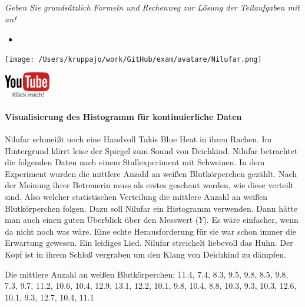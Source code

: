 \documentclass[a4paper, 9pt]{scrartcl}\usepackage[]{graphicx}\usepackage[]{xcolor}
\begin{document}
\textit{Geben Sie grundsätzlich Formeln und Rechenweg zur Lösung der Teilaufgaben mit an!} \\[1Ex]
 

 
\ifcollection
\begin{flushright}
\tiny\vspace{-3Ex}
\textbf{\examinhaltstart}
\exammodulestatversuch $\;\bullet$
\exammodulebiostat
\vspace{-4Ex}
\end{flushright}
\begin{minipage}[t]{0.5\textwidth}
\texttt{[image: /Users/kruppajo/work/GitHub/exam/avatare/Nilufar.png]}
\end{minipage}
\begin{minipage}[t]{0.5\textwidth}
\hfill
\href{https://youtu.be/Q-kyhucwIXs}{\includegraphics[width = 2cm]{img/youtube}}
\end{minipage}
\vspace{-3ex}
\fi



\ifcollection
\paragraph{Visualisierung des Histogramm für kontinuierliche Daten}
\fi

Nilufar schmeißt noch eine Handvoll Takis Blue Heat in ihren Rachen. Im Hintergrund klirrt leise der Spiegel zum Sound von Deichkind. Nilufar betrachtet die folgenden Daten nach einem Stallexperiment mit Schweinen. In dem Experiment wurden die mittlere Anzahl an weißen Blutkörperchen gezählt. Nach der Meinung ihrer Betreuerin muss als erstes geschaut werden, wie diese verteilt sind. Also welcher statistischen Verteilung die mittlere Anzahl an weißen Blutkörperchen folgen. Dazu soll Nilufar ein Histogramm verwenden. Dann hätte man auch einen guten Überblick über den Messwert ($Y$). Es wäre einfacher, wenn da nicht noch was wäre. Eine echte Herausforderung für sie war schon immer die Erwartung gewesen. Ein leidiges Lied. Nilufar streichelt liebevoll das Huhn. Der Kopf ist in ihrem Schloß vergraben um den Klang von Deichkind zu dämpfen.

\begin{center}
Die mittlere Anzahl an weißen Blutkörperchen: 11.4, 7.4, 8.3, 9.5, 9.8, 8.5, 9.8, 7.3, 9.7, 11.2, 10.6, 10.4, 12.9, 13.1, 12.2, 10.1, 9.8, 10.4, 8.8, 10.3, 9.3, 10.3, 12.6, 10.1, 9.3, 12.7, 10.4, 11.1
\end{center}
\end{document}
